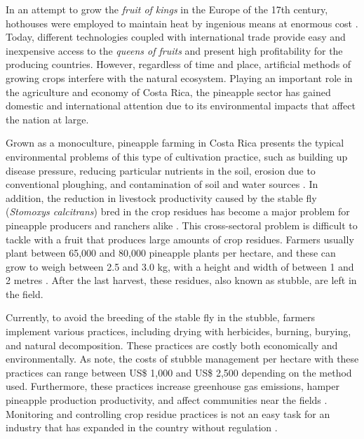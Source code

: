 In an attempt to grow the \textit{fruit of kings} in the Europe of the 17th century, hothouses were employed to maintain heat by ingenious means at enormous cost \citep{o2013pineapple}. Today, different technologies coupled with international trade provide easy and inexpensive access to the \textit{queens of fruits} and present high profitability for the producing countries. However, regardless of time and place, artificial methods of growing crops interfere with the natural ecosystem. Playing an important role in the agriculture and economy of Costa Rica, the pineapple sector has gained domestic and international attention due to its environmental impacts that affect the nation at large.

Grown as a monoculture, pineapple farming in Costa Rica presents the typical environmental problems of this type of cultivation practice, such as building up disease pressure, reducing particular nutrients in the soil, erosion due to conventional ploughing, and contamination of soil and water sources \citep{rodriguez2020agricultural, salaheen2019organic}. In addition, the reduction in livestock productivity caused by the stable fly (\textit{Stomoxys calcitrans}) bred in the crop residues has become a major problem for pineapple producers and ranchers alike \citep{alpizar2016analisis, elbersen2019costa}. This cross-sectoral problem is difficult to tackle with a fruit that produces large amounts of crop residues. Farmers usually plant between 65,000 and 80,000 pineapple plants per hectare, and these can grow to weigh between 2.5 and 3.0 kg, with a height and width of between 1 and 2 metres \citep{asim2015review}. After the last harvest, these residues, also known as stubble, are left in the field. 


Currently, to avoid the breeding of the stable fly in the stubble, farmers implement various practices, including drying with herbicides, burning, burying, and natural decomposition. These practices are costly both economically and environmentally. As \cite{hernandez2018impacto} note, the costs of stubble management per hectare with these practices can range between US\$ 1,000 and US\$ 2,500 depending on the method used. Furthermore, these practices increase greenhouse gas emissions, hamper pineapple production productivity, and affect communities near the fields \citep{cesarino2020fabrication,netz2007climate}. Monitoring and controlling crop residue practices is not an easy task for an industry that has expanded in the country without regulation \citep{rodriguez2020agricultural}.

